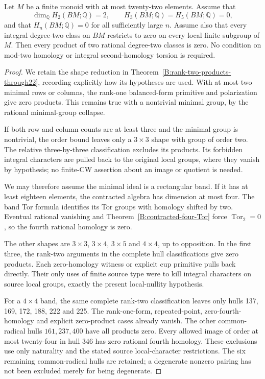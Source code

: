 \begin{theorem}
\label{B:rank-two-rational-through22}
Let $M$ be a finite monoid with at most twenty-two elements.
Assume that
\[
 \dim_{\mathbb Q}H_2(BM;\mathbb Q)=2,\qquad
 H_3(BM;\mathbb Q)=H_5(BM;\mathbb Q)=0,
\]
and that $H_n(BM;\mathbb Q)=0$ for all sufficiently large $n$.
Assume also that every integral degree-two class on $BM$
restricts to zero on every local finite subgroup of $M$.
Then every product of two rational degree-two classes is zero.
No condition on mod-two homology or integral second-homology
torsion is required.
\end{theorem}
\begin{proof}
We retain the shape reduction in
Theorem~\ref{B:rank-two-products-through22}, recording explicitly
how its hypotheses are used. With at most two minimal rows or
columns, the rank-one balanced-form primitive and polarization
give zero products. This remains true with a nontrivial minimal
group, by the rational minimal-group collapse.

If both row and column counts are at least three and the minimal
group is nontrivial, the order bound leaves only a $3\times3$
shape with group of order two. The relative three-by-three
classification excludes its products. Its forbidden integral
characters are pulled back to the original local groups, where
they vanish by hypothesis; no finite-CW assertion about an
image or quotient is needed.

We may therefore assume the minimal ideal is a rectangular band.
If it has at least eighteen elements, the contracted algebra
has dimension at most four. The band Tor formula identifies
its Tor groups with homology shifted by two. Eventual rational
vanishing and Theorem~\ref{B:contracted-four-Tor} force
$\operatorname{Tor}_2=0$, so the fourth rational homology is zero.

The other shapes are $3\times3$, $3\times4$, $3\times5$ and
$4\times4$, up to opposition. In the first three, the rank-two
arguments in the complete hull classifications give zero
products. Each zero-homology witness or explicit cup primitive
pulls back directly. Their only uses of finite source type were
to kill integral characters on source local groups, exactly
the present local-nullity hypothesis.

For a $4\times4$ band, the same complete rank-two classification
leaves only hulls 137, 169, 172, 188, 222 and 225. The rank-one-form,
repeated-point, zero-fourth-homology and explicit zero-product
cases already vanish. The other common-radical hulls
$161,237,400$ have all products zero. Every allowed image of
order at most twenty-four in hull $346$ has zero rational
fourth homology. These exclusions use only naturality and the
stated source local-character restrictions. The six remaining
common-radical hulls are retained; a degenerate nonzero pairing
has not been excluded merely for being degenerate.


\end{proof}
